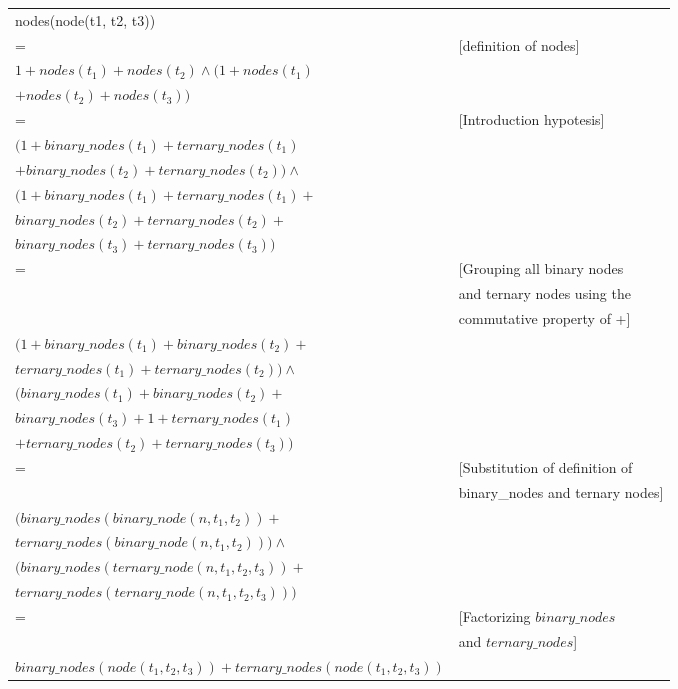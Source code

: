 \documentclass[12pt,fleqn]{article}
\begin{document}
\begin{enumerate}
\begin{tabular}{l l}
  nodes(node(t1, t2, t3)) &  \\
  = & [definition of nodes]  \\
  $1 + nodes(t_1) + nodes(t_2) \land (1 + nodes(t_1)$ & \\
  $+ nodes(t_2) + nodes(t_3))$ & \\
  = & [Introduction hypotesis] \\
  $(1 + binary\_nodes(t_1) + ternary\_nodes(t_1)$ & \\
  $+ binary\_nodes(t_2) + ternary\_nodes(t_2)) \land$ & \\
  $( 1 + binary\_nodes(t_1) + ternary\_nodes(t_1) + $ & \\
  $binary\_nodes(t_2) + ternary\_nodes(t_2) + $ & \\
  $binary\_nodes(t_3) + ternary\_nodes(t_3))$ & \\
  = & [Grouping all binary nodes \\
    & and ternary nodes using the\\
    & commutative property of +] \\
  $(1 + binary\_nodes(t_1) + binary\_nodes(t_2) + $ & \\
  $ternary\_nodes(t_1) + ternary\_nodes(t_2)) \land $ & \\
  $(binary\_nodes(t_1) + binary\_nodes(t_2) + $ & \\
  $binary\_nodes(t_3) + 1 + ternary\_nodes(t_1)$ & \\
  $+ ternary\_nodes(t_2) + ternary\_nodes(t_3))$ & \\
  = & [Substitution of definition of \\
    & binary_nodes and ternary nodes] \\
  $(binary\_nodes(binary\_node(n,t_1,t_2)) + $ & \\
  $ternary\_nodes(binary\_node(n,t_1,t_2))) \land$ & \\
  $(binary\_nodes(ternary\_node(n,t_1,t_2,t_3)) + $ & \\
  $ternary\_nodes(ternary\_node(n,t_1,t_2,t_3)))$  & \\
  = & [Factorizing $binary\_nodes$ \\
    & and $ternary\_nodes$] \\
  $binary\_nodes(node(t_1,t_2,t_3)) + ternary\_nodes(node(t_1, t_2,t_3))$ & \\
\end{tabular}


\color{black}
\end{enumerate}
\end{document}
